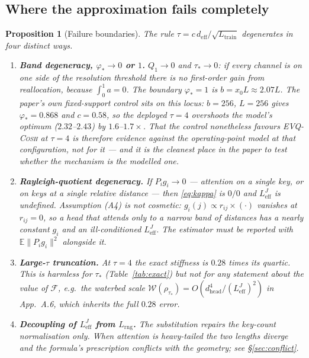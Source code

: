 \documentclass[11pt]{article}
\newtheorem{proposition}[theorem]{Proposition}
\theoremstyle{definition}
\newcommand{\evq}{\textsc{EVQ-Cosh}}
\newcommand{\dhd}{d_{\mathrm{head}}}
\newcommand{\deff}{d_{\mathrm{eff}}}
\newcommand{\Ltr}{L_{\mathrm{train}}}
\newcommand{\Leff}{L_{\mathrm{eff}}^{J}}
\newcommand{\E}{\mathbb{E}}
\begin{document}
\subsection{Where the approximation fails completely}

\begin{proposition}[Failure boundaries]\label{prop:failure}
The rule $\tau=c\,\deff/\sqrt{\Ltr}$ degenerates in four distinct ways.
\begin{enumerate}
\item[\textup{(F1)}] \textbf{Band degeneracy, $\varphi_*\to0$ or $1$.} $Q_1\to0$ and $\tau_*\to0$:
if every channel is on one side of the resolution threshold there is no first-order gain from
reallocation, because $\int_0^1a=0$. The boundary $\varphi_*=1$ is $b=x_0L\approx2.07L$.
\emph{The paper's own fixed-support control sits on this locus}: $b{=}256$, $L{=}256$ gives
$\varphi_*=0.868$ and $c=0.58$, so the deployed $\tau{=}4$ overshoots the model's optimum
($2.32$--$2.43$) by $1.6$--$1.7\times$. That the control nonetheless favours \evq{} at $\tau{=}4$ is
therefore evidence \emph{against} the operating-point model at that configuration, not for it ---
and it is the cleanest place in the paper to test whether the mechanism is the modelled one.
\item[\textup{(F2)}] \textbf{Rayleigh-quotient degeneracy.} If $P_ig_i\to0$ --- attention on a single
key, or on keys at a single relative distance --- then \eqref{eq:kappa} is $0/0$ and $\Leff$ is
undefined. Assumption (A4) is not cosmetic: $g_i(j)\propto r_{ij}\times(\cdot)$ vanishes at
$r_{ij}=0$, so a head that attends only to a narrow band of distances has a nearly constant $g_i$
and an ill-conditioned $\Leff$. The estimator must be reported with $\E\|P_ig_i\|^2$ alongside it.
\item[\textup{(F3)}] \textbf{Large-$\tau$ truncation.} At $\tau{=}4$ the exact stiffness is $0.28$
times its quartic. This is harmless for $\tau_*$ (Table~\ref{tab:exact}) but \emph{not} for any
statement about the value of $\mathcal F$, e.g.\ the waterbed scale
$\mathcal W(\rho_{\tau_*})=O(\dhd^4/(\Leff)^2)$ in App.~A.6, which inherits the full $0.28$ error.
\item[\textup{(F4)}] \textbf{Decoupling of $\Leff$ from $L_{\mathrm{rng}}$.} The substitution repairs
the key-count normalisation only. When attention is heavy-tailed the two lengths diverge and the
formula's prescription conflicts with the geometry; see \S\ref{sec:conflict}.
\end{enumerate}
\end{proposition}
\end{document}
